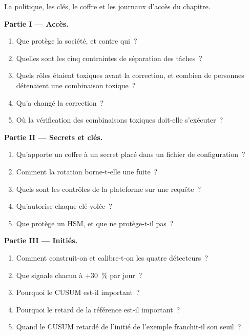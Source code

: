 \begin{problem}\label{pb:pl:security:1}
La politique, les clés, le coffre et les journaux d'accès du chapitre.

\medskip\noindent\textbf{Partie I --- Accès.}
\begin{enumerate}
\item Que protège la société, et contre qui~?
\item Quelles sont les cinq contraintes de séparation des tâches~?
\item Quels rôles étaient toxiques avant la correction, et combien de personnes détenaient une combinaison toxique~?
\item Qu'a changé la correction~?
\item Où la vérification des combinaisons toxiques doit-elle s'exécuter~?
\end{enumerate}

\medskip\noindent\textbf{Partie II --- Secrets et clés.}
\begin{enumerate}[resume]
\item Qu'apporte un coffre à un secret placé dans un fichier de configuration~?
\item Comment la rotation borne-t-elle une fuite~?
\item Quels sont les contrôles de la plateforme sur une requête~?
\item Qu'autorise chaque clé volée~?
\item Que protège un HSM, et que ne protège-t-il pas~?
\end{enumerate}

\medskip\noindent\textbf{Partie III --- Initiés.}
\begin{enumerate}[resume]
\item Comment construit-on et calibre-t-on les quatre détecteurs~?
\item Que signale chacun à +30~\% par jour~?
\item Pourquoi le CUSUM est-il important~?
\item Pourquoi le retard de la référence est-il important~?
\item Quand le CUSUM retardé de l'initié de l'exemple franchit-il son seuil~?
\end{enumerate}


\end{problem}
